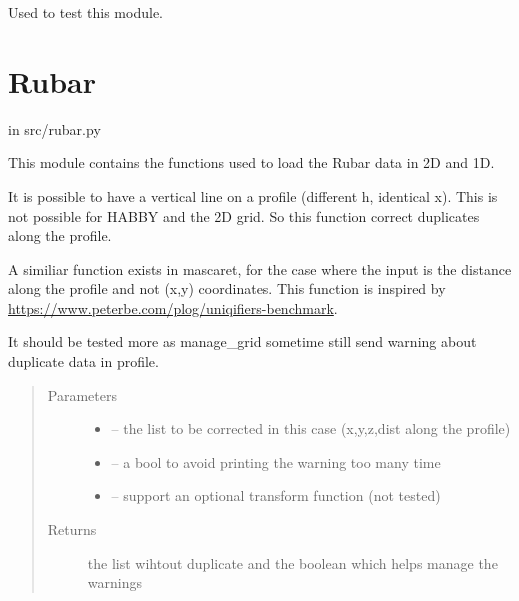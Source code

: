 \documentclass[letterpaper,10pt,english]{sphinxmanual}
\begin{document}

\begin{fulllineitems}
\label{\detokenize{index:src.river2d.main}}
Used to test this module.

\end{fulllineitems}



\section{Rubar}
\label{\detokenize{index:rubar}}
in src/rubar.py

This module contains the functions used to load the Rubar data in 2D and 1D.
\label{\detokenize{index:module-src.rubar}}

\begin{fulllineitems}
\label{\detokenize{index:src.rubar.correct_duplicate_xy}}
It is possible to have a vertical line on a profile (different h, identical x). This is not possible for HABBY and
the 2D grid. So this function correct duplicates along the profile.

A similiar function exists in mascaret, for the case where the input is the distance along the profile and not
(x,y) coordinates. This function is inspired by \url{https://www.peterbe.com/plog/uniqifiers-benchmark}.

It should be tested more as manage\_grid sometime still send warning about duplicate data in profile.
\begin{quote}\begin{description}
\item[{Parameters}] \leavevmode\begin{itemize}
\item {} 
 -- the list to be corrected in this case (x,y,z,dist along the profile)

\item {} 
 -- a bool to avoid printing the warning too many time

\item {} 
 -- support an optional transform function (not tested)

\end{itemize}

\item[{Returns}] \leavevmode
the list wihtout duplicate and the boolean which helps manage the warnings

\end{description}\end{quote}

\end{fulllineitems}
\end{document}
